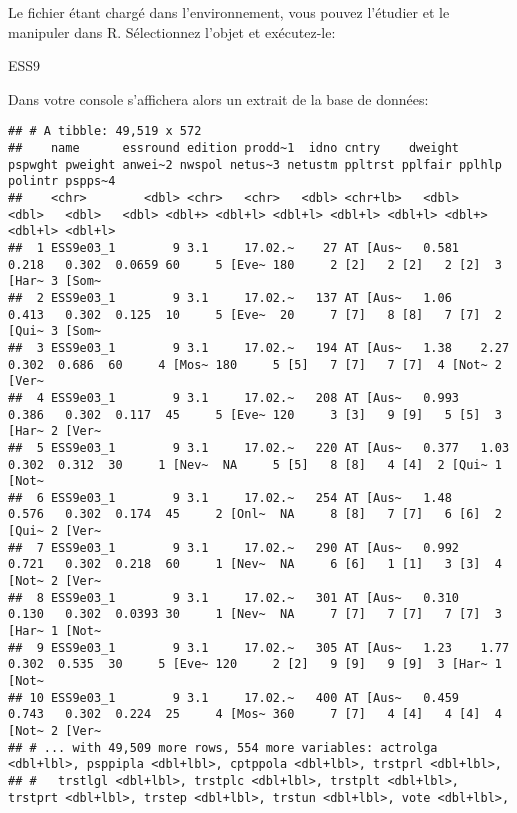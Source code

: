 \documentclass[
]{book}
\newenvironment{Shaded}{\begin{snugshade}}{\end{snugshade}}
\newcommand{\NormalTok}[1]{#1}
\begin{document}
Le fichier étant chargé dans l'environnement, vous pouvez l'étudier et le manipuler dans R. Sélectionnez l'objet et exécutez-le:

\begin{Shaded}
\begin{Highlighting}[]
\NormalTok{ESS9}
\end{Highlighting}
\end{Shaded}

Dans votre console s'affichera alors un extrait de la base de données:

\begin{verbatim}
## # A tibble: 49,519 x 572
##    name      essround edition prodd~1  idno cntry    dweight pspwght pweight anwei~2 nwspol netus~3 netustm ppltrst pplfair pplhlp polintr pspps~4
##    <chr>        <dbl> <chr>   <chr>   <dbl> <chr+lb>   <dbl>   <dbl>   <dbl>   <dbl> <dbl+> <dbl+l> <dbl+l> <dbl+l> <dbl+l> <dbl+> <dbl+l> <dbl+l>
##  1 ESS9e03_1        9 3.1     17.02.~    27 AT [Aus~   0.581   0.218   0.302  0.0659 60     5 [Eve~ 180     2 [2]   2 [2]   2 [2]  3 [Har~ 3 [Som~
##  2 ESS9e03_1        9 3.1     17.02.~   137 AT [Aus~   1.06    0.413   0.302  0.125  10     5 [Eve~  20     7 [7]   8 [8]   7 [7]  2 [Qui~ 3 [Som~
##  3 ESS9e03_1        9 3.1     17.02.~   194 AT [Aus~   1.38    2.27    0.302  0.686  60     4 [Mos~ 180     5 [5]   7 [7]   7 [7]  4 [Not~ 2 [Ver~
##  4 ESS9e03_1        9 3.1     17.02.~   208 AT [Aus~   0.993   0.386   0.302  0.117  45     5 [Eve~ 120     3 [3]   9 [9]   5 [5]  3 [Har~ 2 [Ver~
##  5 ESS9e03_1        9 3.1     17.02.~   220 AT [Aus~   0.377   1.03    0.302  0.312  30     1 [Nev~  NA     5 [5]   8 [8]   4 [4]  2 [Qui~ 1 [Not~
##  6 ESS9e03_1        9 3.1     17.02.~   254 AT [Aus~   1.48    0.576   0.302  0.174  45     2 [Onl~  NA     8 [8]   7 [7]   6 [6]  2 [Qui~ 2 [Ver~
##  7 ESS9e03_1        9 3.1     17.02.~   290 AT [Aus~   0.992   0.721   0.302  0.218  60     1 [Nev~  NA     6 [6]   1 [1]   3 [3]  4 [Not~ 2 [Ver~
##  8 ESS9e03_1        9 3.1     17.02.~   301 AT [Aus~   0.310   0.130   0.302  0.0393 30     1 [Nev~  NA     7 [7]   7 [7]   7 [7]  3 [Har~ 1 [Not~
##  9 ESS9e03_1        9 3.1     17.02.~   305 AT [Aus~   1.23    1.77    0.302  0.535  30     5 [Eve~ 120     2 [2]   9 [9]   9 [9]  3 [Har~ 1 [Not~
## 10 ESS9e03_1        9 3.1     17.02.~   400 AT [Aus~   0.459   0.743   0.302  0.224  25     4 [Mos~ 360     7 [7]   4 [4]   4 [4]  4 [Not~ 2 [Ver~
## # ... with 49,509 more rows, 554 more variables: actrolga <dbl+lbl>, psppipla <dbl+lbl>, cptppola <dbl+lbl>, trstprl <dbl+lbl>,
## #   trstlgl <dbl+lbl>, trstplc <dbl+lbl>, trstplt <dbl+lbl>, trstprt <dbl+lbl>, trstep <dbl+lbl>, trstun <dbl+lbl>, vote <dbl+lbl>,

\end{verbatim}
\end{document}
